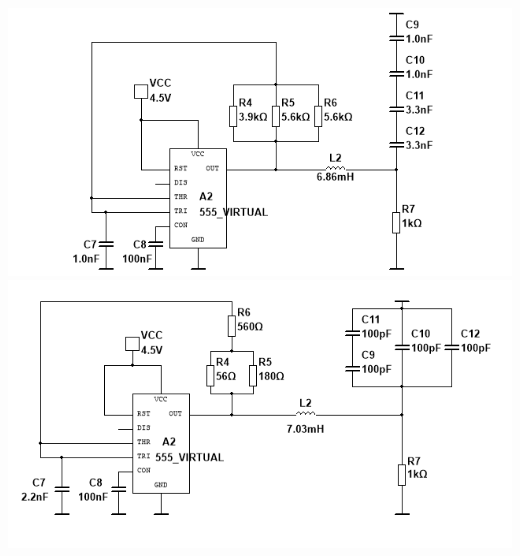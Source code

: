 \documentclass[a4paper]{article}
\begin{document}
\begin{sloppypar}
    \label{bilaga:Schema-Oscillatorkretsar}
    \includegraphics[width = \textwidth]{555-100kHz-circuit.png}
    \includegraphics[width = \textwidth]{555-117kHz-circuit.png}

    \newpage

\end{sloppypar}
\end{document}
